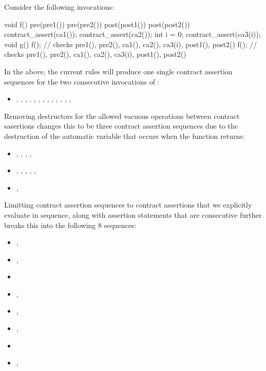Consider the following invocations:
\begin{codeblock}
void f()
  pre(pre1())
  pre(pre2())
  post(post1())
  post(post2())
{
  contract_assert(ca1());
  contract_assert(ca2());
  int i = 0;
  contract_assert(ca3(i));
}
void g()
{
  f(); // checks pre1(), pre2(), ca1(), ca2(), ca3(i), post1(), post2()
  f(); // checks pre1(), pre2(), ca1(), ca2(), ca3(i), post1(), post2()
}
\end{codeblock}
In the above, the current rules will produce one single contract
assertion sequences for the two consecutive invocations
of :
\begin{itemize}
\item{
 , , , , , , ,
 , , , , , , 
}
\end{itemize}

Removing destructors for the allowed vacuous
operations between contract sasertions changes this to be
three contract assertion sequences due to the destruction of
the automatic variable  that occurs when the
function  returns:
\begin{itemize}
\item{
 , , , , 
}
\item{
 , 
 , , , , 
}
\item{
  , 
}
\end{itemize}

Limitting contract assertion sequences to contract assertions
that we explicitly evaluate in sequence, along with assertion
statements that are consecutive further breaks this
into the following $8$ sequences:
\begin{itemize}
\item{
 , 
}
\item{
 , 
}
\item{
}
\item{
 , 
}
\item{
 , 
}
\item{
 , 
}
\item{
}
\item{
  , 
}
\end{itemize}

